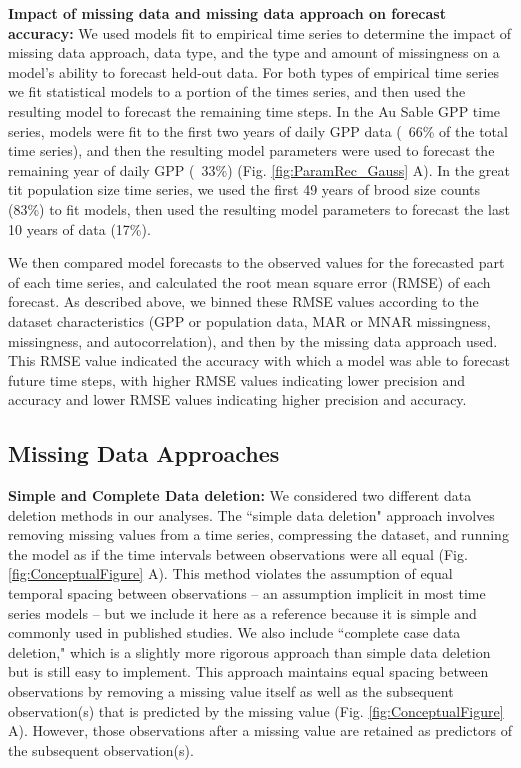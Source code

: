 \documentclass{article}
\begin{document}
\noindent\textbf{Impact of missing data and missing data approach on forecast accuracy:} 
We used models fit to empirical time series to determine the impact of missing data approach, data type, and the type and amount of missingness on a model's ability to forecast held-out data. For both types of empirical time series we fit statistical models to a portion of the times series, and then used the resulting model to forecast the remaining time steps. In the Au Sable GPP time series, models were fit to the first two years of daily GPP data (~66\% of the total time series), and then the resulting model parameters were used to forecast the remaining year of daily GPP (~33\%) (Fig. \ref{fig:ParamRec_Gauss} A). In the great tit population size time series, we used the first 49 years of brood size counts (83\%) to fit models, then used the resulting model parameters to forecast the last 10 years of data (17\%).

We then compared model forecasts to the observed values for the forecasted part of each time series, and calculated the root mean square error (RMSE) of each forecast. As described above, we binned these RMSE values according to the dataset characteristics (GPP or population data, MAR or MNAR missingness, missingness, and autocorrelation), and then by the missing data approach used. This RMSE value indicated the accuracy with which a model was able to forecast future time steps, with higher RMSE values indicating lower precision and accuracy and lower RMSE values indicating higher precision and accuracy.     


\subsection*{Missing Data Approaches}

\noindent\textbf{Simple and Complete Data deletion:} 
We considered two different data deletion methods in our analyses. The ``simple data deletion" approach involves removing missing values from a time series, compressing the dataset, and running the model as if the time intervals between observations were all equal (Fig. \ref{fig:ConceptualFigure} A). This method violates the assumption of equal temporal spacing between observations -- an assumption implicit in most time series models -- but we include it here as a reference because it is simple and commonly used in published studies. We also include ``complete case data deletion," which is a slightly more rigorous approach than simple data deletion but is still easy to implement. This approach maintains equal spacing between observations by removing a missing value itself as well as the subsequent observation(s) that is predicted by the missing value (Fig. \ref{fig:ConceptualFigure} A). However, those observations after a missing value are retained as predictors of the subsequent observation(s). 
\end{document}
